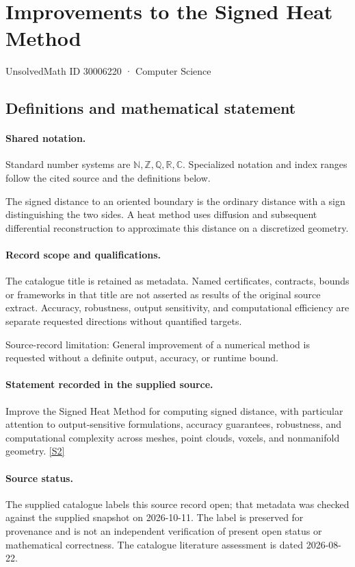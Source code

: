 \documentclass[11pt]{article}
\newcommand{\sref}[2]{\hyperlink{source:#1:#2}{[S#2]}}
\begin{document}
\setcounter{section}{30006219}
\section{Improvements to the Signed Heat Method}\label{30006220}
{\small\sffamily UnsolvedMath ID 30006220 · Computer Science}
\subsection{Definitions and mathematical statement}

\paragraph{Shared notation.}Standard number systems are $\mathbb N,\mathbb Z,\mathbb Q,\mathbb R,\mathbb C$. Specialized notation and index ranges follow the cited source and the definitions below.


The signed distance to an oriented boundary is the ordinary distance with a sign distinguishing the two sides. A heat method uses diffusion and subsequent differential reconstruction to approximate this distance on a discretized geometry.
\paragraph{Record scope and qualifications.}
The catalogue title is retained as metadata. Named certificates, contracts, bounds or frameworks in that title are not asserted as results of the original source extract.
Accuracy, robustness, output sensitivity, and computational efficiency are separate requested directions without quantified targets.

Source-record limitation: General improvement of a numerical method is requested without a definite output, accuracy, or runtime bound.
\paragraph{Statement recorded in the supplied source.}
Improve the Signed Heat Method for computing signed distance, with particular attention to output-sensitive formulations, accuracy guarantees, robustness, and computational complexity across meshes, point clouds, voxels, and nonmanifold geometry. \sref{30006220}{2}
\paragraph{Source status.}
The supplied catalogue labels this source record open; that metadata was checked against the supplied snapshot on 2026-10-11. The label is preserved for provenance and is not an independent verification of present open status or mathematical correctness. The catalogue literature assessment is dated 2026-08-22.
\end{document}
